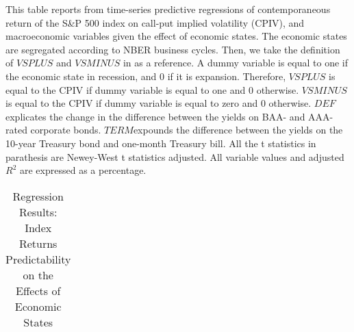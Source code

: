 


\begin{table}[h]

\caption{Regression Results: Index Returns Predictability on the Effects of Economic States}\label{table:EcoStates}
\begin{threeparttable}

\medskip
\begin{spacing}{1.1}
{\footnotesize  
This table reports from time-series predictive regressions of contemporaneous return of the S\&P 500 index on call-put implied volatility (CPIV), and macroeconomic variables given the effect of economic states. The economic states are segregated according to NBER business cycles. Then, we take the definition of $VSPLUS$ and $VSMINUS$ in \textcite{atilgan2015implied} as a reference. A dummy variable is equal to one if the economic state in recession, and 0 if it is expansion. Therefore, $VSPLUS$ is equal to the CPIV if dummy variable is equal to one and 0 otherwise. $VSMINUS$ is equal to the CPIV if dummy variable is equal to zero and 0 otherwise. $DEF$ explicates the change in the difference between the yields on BAA- and AAA-rated corporate bonds. $TERM $expounds the difference between the yields on the 10-year Treasury bond and one-month Treasury bill. All the t statistics in parathesis are Newey-West t statistics adjusted. All variable values and adjusted $R^{2}$ are expressed as a percentage.  
}
\end{spacing}
\medskip
\medskip
\footnotesize
\centering
\begin{tabular}{ccccccccccccccc}
\toprule


\end{tabular}
\end{threeparttable}
\end{table}
